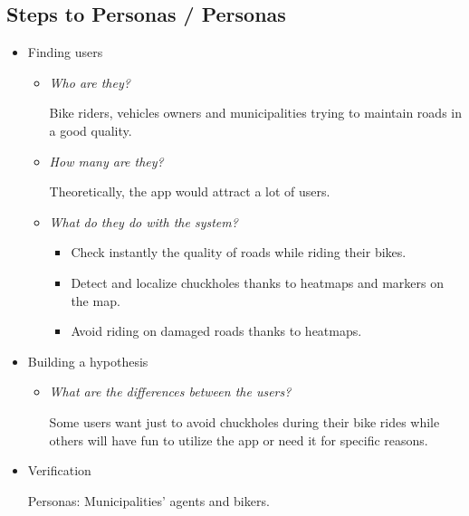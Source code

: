 \documentclass[10pt,a4paper]{article} %
\begin{document}
\subsection{Steps to Personas / Personas}
\begin{itemize}
\item Finding users

\begin{itemize}
\item \textit{Who are they?}

Bike riders, vehicles owners and municipalities trying to maintain roads in a good quality.

\item \textit{How many are they?}

Theoretically, the app would attract a lot of users.

\item  	\textit{What do they do with the system?}

\begin{itemize}
\item Check instantly the quality of roads while riding their bikes.

\item Detect and localize chuckholes thanks to heatmaps and markers on the map.

\item Avoid riding on damaged roads thanks to heatmaps.
\end{itemize}

\end{itemize}

 \end{itemize}   
 
 \begin{itemize}
\item Building a hypothesis
 \begin{itemize}
 \item  	\textit{What are the differences between the users?}
 
 Some users want just to avoid chuckholes during their bike rides while others will have fun to utilize the app or need it for specific reasons. 
 \end{itemize}
  \end{itemize}
   
   \begin{itemize}
\item Verification

Personas: Municipalities’ agents and bikers.
 
   \end{itemize} 
 
\end{document}
